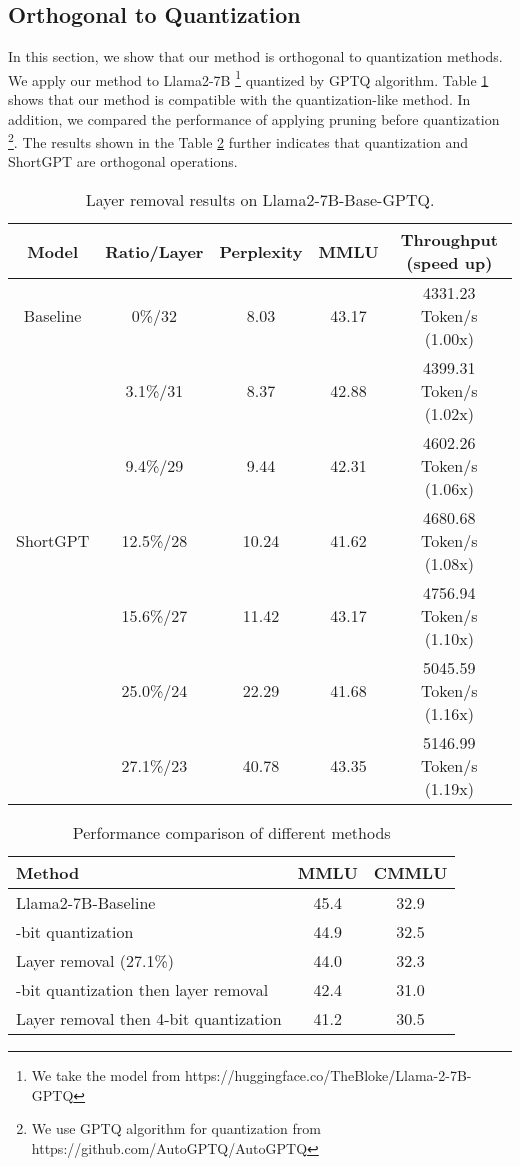 		\subsection{Orthogonal to Quantization}
		In this section, we show that our method is orthogonal to quantization methods. We apply our method to Llama2-7B \footnote{We take the model from https://huggingface.co/TheBloke/Llama-2-7B-GPTQ} quantized by GPTQ algorithm. Table \ref{lab:orthogonal} shows that our method is compatible with the quantization-like method. In addition, we compared the performance of applying pruning before quantization \footnote{We use GPTQ algorithm for quantization from https://github.com/AutoGPTQ/AutoGPTQ}. The results shown in the Table \ref{tab:performance_comparison} further indicates that quantization and ShortGPT are orthogonal operations.
		\renewcommand\arraystretch{1.2} 
		\begin{table}[t]
			\small
			\caption{Layer removal results on Llama2-7B-Base-GPTQ.}
			\label{lab:orthogonal}
			\centering
			\begin{tabular}{ccccc}
				\hline
				Model    & Ratio/Layer & Perplexity & MMLU & Throughput (speed up) \\ \hline \hline
				
				Baseline & 0\%/32 &8.03 &43.17  & 4331.23 Token/s (1.00x) \\ \hline
				&  3.1\%/31   & 8.37   &42.88 & 4399.31 Token/s (1.02x)  \\ 
				& 9.4\%/29   &9.44    & 42.31 & 4602.26 Token/s (1.06x)   \\ 
				ShortGPT    & 12.5\%/28   &10.24 &41.62      & 4680.68 Token/s (1.08x)  \\ 
				& 15.6\%/27   &11.42    &43.17  & 4756.94 Token/s (1.10x)   \\ 
				& 25.0\%/24 &22.29  &41.68  & 5045.59 Token/s  (1.16x)  \\ 
				& 27.1\%/23   &40.78&43.35 & 5146.99 Token/s  (1.19x)  \\ 
				\hline
			\end{tabular}
		\end{table}
		
		
		\begin{table}[t]
			\small
			\caption{Performance comparison of different methods}
			\label{tab:performance_comparison}
			\centering
			\begin{tabular}{@{}lcc@{}}
				\toprule
				Method & MMLU & CMMLU \\
				\midrule     \midrule
				Llama2-7B-Baseline & 45.4 & 32.9 \\
				\addlinespace
				4-bit quantization & 44.9 & 32.5 \\
				\addlinespace
				Layer removal (27.1\%) & 44.0 & 32.3 \\
				\addlinespace
				4-bit quantization then layer removal & 42.4 & 31.0 \\
				\addlinespace
				Layer removal then 4-bit quantization & 41.2 & 30.5 \\
				\bottomrule
			\end{tabular}
		\end{table}
		
